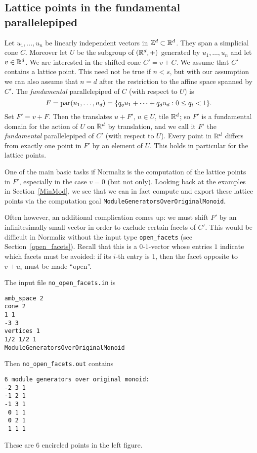 \subsection{Lattice points in the fundamental parallelepiped}\label{LattPointsFPE}

Let $u_1,\dots,u_n$ be linearly independent vectors in ${\mathbb Z}^d\subset{\mathbb R}^d$. They span a simplicial cone $C$. Moreover let $U$ be the subgroup of $({\mathbb R}^d,+)$ generated by $u_1,\dots,u_n$ and let $v\in{\mathbb R}^d$. We are interested in the shifted cone $C'=v+C$. We assume that $C'$ contains a lattice point. This need not be true if $n<s$, but with our assumption we can also assume that $n=d$ after the restriction to the affine space spanned by $C'$. The \emph{fundamental} parallelepiped of $C$ (with respect to $U$) is
$$
F=\operatorname{par}(u_1,\dots,u_d)=\{q_qu_1+\dots+q_du_d: 0\le q_i<1\}.
$$
Set $F'=v+F$. Then the translates $u+F'$, $u\in U$, tile ${\mathbb R}^d$; so $F'$ is a fundamental domain for the action of $U$ on ${\mathbb R}^d$ by translation, and we call it $F'$ the \emph{fundamental} parallelepiped of $C'$ (with respect to $U$). Every point in ${\mathbb R}^d$ differs from exactly one point in $F'$ by an element of $U$. This holds in particular for the lattice points.

One of the main basic tasks if Normaliz is the computation of the lattice points in $F'$, especially in the case $v=0$ (but not only). Looking back at the examples in Section~\ref{MinMod}, we see that we can in fact compute and export these lattice points via the computation goal \verb|ModuleGeneratorsOverOriginalMonoid|.

Often however, an additional complication comes up: we must shift $F'$ by an infinitesimally small vector in order to exclude certain facets of $C'$. This would be difficult in Normaliz without the input type \verb|open_facets| (see Section~\ref{open_facets}). Recall that this is a $0$-$1$-vector whose entries $1$ indicate which facets must be avoided: if its $i$-th entry is $1$, then the facet opposite to $v+u_i$ must be made ``open''.

The input file \verb|no_open_facets.in| is
\begin{Verbatim}
amb_space 2
cone 2
1 1
-3 3
vertices 1
1/2 1/2 1
ModuleGeneratorsOverOriginalMonoid
\end{Verbatim}

Then \verb|no_open_facets.out| contains
\begin{Verbatim}
6 module generators over original monoid:
-2 3 1
-1 2 1
-1 3 1
 0 1 1
 0 2 1
 1 1 1
\end{Verbatim}
These are $6$ encircled points in the left figure.

